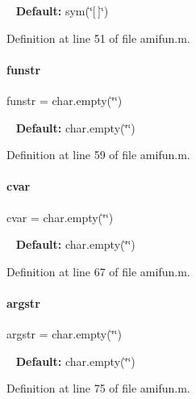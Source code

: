 ~\newline
{\bfseries Default\+:} sym(\char`\"{}\mbox{[}$\,$\mbox{]}\char`\"{}) 

Definition at line 51 of file amifun.\+m.

\mbox{\label{classamifun_a484b54379bc8b29b6ce65d84966ea4c4}} 
\paragraph{\texorpdfstring{funstr}{funstr}}
{\footnotesize\ttfamily funstr = char.\+empty(\char`\"{}\char`\"{})}

~\newline
{\bfseries Default\+:} char.\+empty(\char`\"{}\char`\"{}) 

Definition at line 59 of file amifun.\+m.

\mbox{\label{classamifun_a716c1ceb8235bc1005b606f777530ede}} 
\paragraph{\texorpdfstring{cvar}{cvar}}
{\footnotesize\ttfamily cvar = char.\+empty(\char`\"{}\char`\"{})}

~\newline
{\bfseries Default\+:} char.\+empty(\char`\"{}\char`\"{}) 

Definition at line 67 of file amifun.\+m.

\mbox{\label{classamifun_aa3914760f4131288b95f0f23d0fdfa6d}} 
\paragraph{\texorpdfstring{argstr}{argstr}}
{\footnotesize\ttfamily argstr = char.\+empty(\char`\"{}\char`\"{})}

~\newline
{\bfseries Default\+:} char.\+empty(\char`\"{}\char`\"{}) 

Definition at line 75 of file amifun.\+m.

\mbox{\label{classamifun_a69ffe5c24686ceb79ed44399e6be556c}} 
